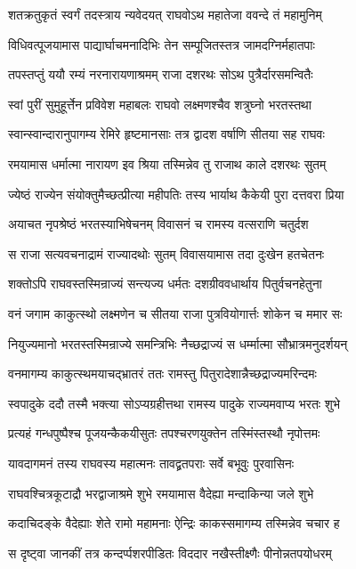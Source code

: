 \twolineshloka
{शतक्रतुकृतं स्वर्गं तदस्त्राय न्यवेदयत्}
{राघवोऽथ महातेजा ववन्दे तं महामुनिम्}%

\twolineshloka
{विधिवत्पूजयामास पाद्यार्घाचमनादिभिः}
{तेन सम्पूजितस्तत्र जामदग्निर्महातपाः}%

\twolineshloka
{तपस्तप्तुं ययौ रम्यं नरनारायणाश्रमम्}
{राजा दशरथः सोऽथ पुत्रैर्दारसमन्वितैः}%

\twolineshloka
{स्वां पुरीं सुमुहूर्त्तेन प्रविवेश महाबलः}
{राघवो लक्ष्मणश्चैव शत्रुघ्नो भरतस्तथा}%

\twolineshloka
{स्वान्स्वान्दारानुपागम्य रेमिरे हृष्टमानसाः}
{तत्र द्वादश वर्षाणि सीतया सह राघवः}%

\twolineshloka
{रमयामास धर्मात्मा नारायण इव श्रिया}
{तस्मिन्नेव तु राजाथ काले दशरथः सुतम्}%

\twolineshloka
{ज्येष्ठं राज्येन संयोक्तुमैच्छत्प्रीत्या महीपतिः}
{तस्य भार्याथ कैकेयी पुरा दत्तवरा प्रिया}%

\twolineshloka
{अयाचत नृपश्रेष्ठं भरतस्याभिषेचनम्}
{विवासनं च रामस्य वत्सराणि चतुर्दश}%

\twolineshloka
{स राजा सत्यवचनाद्रामं राज्यादथोः सुतम्}
{विवासयामास तदा दुःखेन हतचेतनः}%

\twolineshloka
{शक्तोऽपि राघवस्तस्मिन्राज्यं सन्त्यज्य धर्मतः}
{दशग्रीववधार्थाय पितुर्वचनहेतुना}%

\twolineshloka
{वनं जगाम काकुत्स्थो लक्ष्मणेन च सीतया}
{राजा पुत्रवियोगार्त्तः शोकेन च ममार सः}%

\twolineshloka
{नियुज्यमानो भरतस्तस्मिन्राज्ये समन्त्रिभिः}
{नैच्छद्राज्यं स धर्म्मात्मा सौभ्रात्रमनुदर्शयन्}%

\twolineshloka
{वनमागम्य काकुत्स्थमयाचद्भ्रातरं ततः}
{रामस्तु पितुरादेशान्नैच्छद्राज्यमरिन्दमः}%

\twolineshloka
{स्वपादुके ददौ तस्मै भक्त्या सोऽप्यग्रहीत्तथा}
{रामस्य पादुके राज्यमवाप्य भरतः शुभे}%

\twolineshloka
{प्रत्यहं गन्धपुष्पैश्च पूजयन्कैकयीसुतः}
{तपश्चरणयुक्तेन तस्मिंस्तस्थौ नृपोत्तमः}%

\twolineshloka
{यावदागमनं तस्य राघवस्य महात्मनः}
{तावद्व्रतपराः सर्वे बभूवुः पुरवासिनः}%

\twolineshloka
{राघवश्चित्रकूटाद्रौ भरद्वाजाश्रमे शुभे}
{रमयामास वैदेह्या मन्दाकिन्या जले शुभे}%

\twolineshloka
{कदाचिदङ्के वैदेह्याः शेते रामो महामनाः}
{ऐन्द्रिः काकस्समागम्य तस्मिन्नेव चचार ह}%

\twolineshloka
{स दृष्ट्वा जानकीं तत्र कन्दर्प्पशरपीडितः}
{विददार नखैस्तीक्ष्णैः पीनोन्नतपयोधरम्}%

